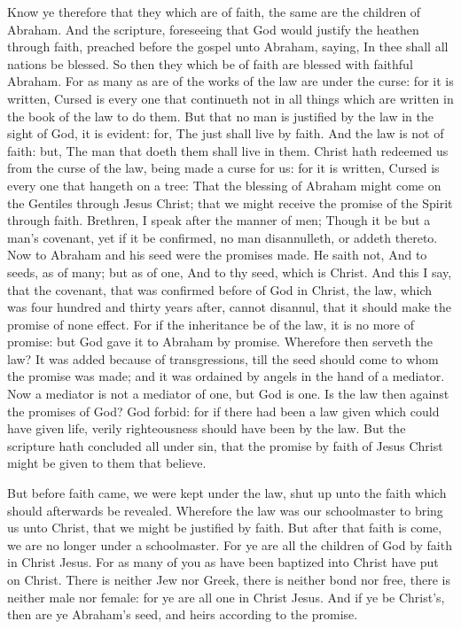  Know ye therefore that they which are of faith, the same
are the children of Abraham.  And the scripture, foreseeing
that God would justify the heathen through faith, preached before the
gospel unto Abraham, saying, In thee shall all nations be blessed.
 So then they which be of faith are blessed with faithful
Abraham.  For as many as are of the works of the law are
under the curse: for it is written, Cursed is every one that continueth
not in all things which are written in the book of the law to do them.
 But that no man is justified by the law in the sight of
God, it is evident: for, The just shall live by faith.  And
the law is not of faith: but, The man that doeth them shall live in
them.  Christ hath redeemed us from the curse of the law,
being made a curse for us: for it is written, Cursed is every one that
hangeth on a tree:  That the blessing of Abraham might come
on the Gentiles through Jesus Christ; that we might receive the promise
of the Spirit through faith.  Brethren, I speak after the
manner of men; Though it be but a man's covenant, yet if it be
confirmed, no man disannulleth, or addeth thereto.  Now to
Abraham and his seed were the promises made. He saith not, And to seeds,
as of many; but as of one, And to thy seed, which is Christ.
 And this I say, that the covenant, that was confirmed
before of God in Christ, the law, which was four hundred and thirty
years after, cannot disannul, that it should make the promise of none
effect.  For if the inheritance be of the law, it is no
more of promise: but God gave it to Abraham by promise. 
Wherefore then serveth the law? It was added because of transgressions,
till the seed should come to whom the promise was made; and it was
ordained by angels in the hand of a mediator.  Now a
mediator is not a mediator of one, but God is one.  Is the
law then against the promises of God? God forbid: for if there had been
a law given which could have given life, verily righteousness should
have been by the law.  But the scripture hath concluded all
under sin, that the promise by faith of Jesus Christ might be given to
them that believe.

 But before faith came, we were kept under the law, shut up
unto the faith which should afterwards be revealed. 
Wherefore the law was our schoolmaster to bring us unto Christ, that we
might be justified by faith.  But after that faith is come,
we are no longer under a schoolmaster.  For ye are all the
children of God by faith in Christ Jesus.  For as many of
you as have been baptized into Christ have put on Christ. 
There is neither Jew nor Greek, there is neither bond nor free, there is
neither male nor female: for ye are all one in Christ Jesus.
 And if ye be Christ's, then are ye Abraham's seed, and
heirs according to the promise.

